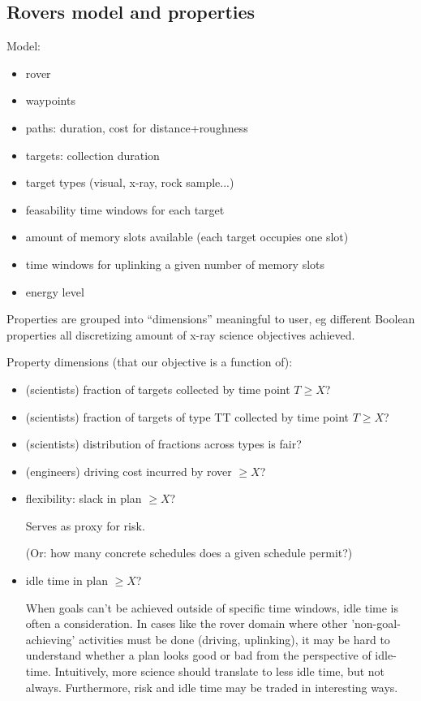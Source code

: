 \subsection{Rovers model and properties}
\label{xpp-rovers:model}

Model: 
\begin{itemize}
\item rover
\item waypoints
\item paths: duration, cost for distance+roughness
\item targets: collection duration
\item target types (visual, x-ray, rock sample...)
\item feasability time windows for each target
\item amount of memory slots available (each target occupies one slot)
\item time windows for uplinking a given number of memory slots
\item energy level
\end{itemize}

Properties are grouped into ``dimensions'' meaningful to user, eg
different Boolean properties all discretizing amount of x-ray science
objectives achieved.


Property dimensions (that our objective is a function of):
\begin{itemize}
\item (scientists) fraction of targets collected by time point $T \geq
  X$?
\item (scientists) fraction of targets of type TT collected by time
  point $T \geq X$?
\item (scientists) distribution of fractions across types is fair?
\item (engineers) driving cost incurred by rover $\geq X$?
\item flexibility: slack in plan $\geq X$? 

  Serves as proxy for risk.

  (Or: how many concrete schedules does a given schedule permit?)
\item idle time in plan $\geq X$?

  When goals can't be achieved outside of specific time windows, idle
  time is often a consideration.  In cases like the rover domain where
  other 'non-goal-achieving' activities must be done (driving,
  uplinking), it may be hard to understand whether a plan looks good
  or bad from the perspective of idle-time. Intuitively, more science
  should translate to less idle time, but not always.  Furthermore,
  risk and idle time may be traded in interesting ways.

\end{itemize}


